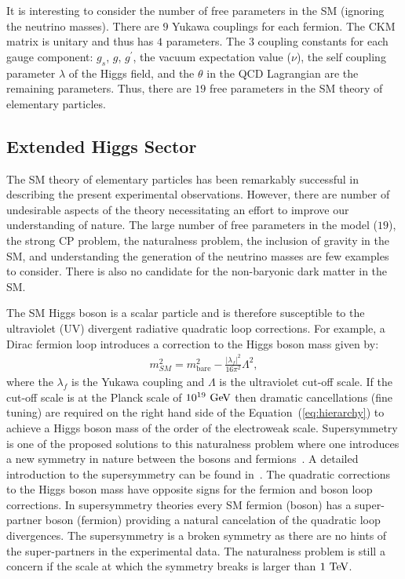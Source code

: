 It is interesting to consider the number of free parameters in the SM (ignoring the neutrino masses). There are $9$ Yukawa couplings for each fermion. The CKM matrix is unitary and thus has $4$ parameters. The $3$ coupling constants for each gauge component: $g_s$, $g$, $g^{'}$, the vacuum expectation value ($\nu$), the self coupling parameter $\lambda$ of the Higgs field, and the $\theta$ in the QCD Lagrangian are the remaining parameters. Thus, there are $19$ free parameters in the SM theory of elementary particles. 

\subsection{Extended Higgs Sector}

The SM theory of elementary particles has been remarkably successful in describing the present experimental observations. However, there are number of undesirable aspects of the theory necessitating an effort to improve our understanding of nature. The large number of free parameters in the model ($19$), the strong CP problem, the naturalness problem, the inclusion of gravity in the SM, and understanding the generation of the neutrino masses are few examples to consider. There is also no candidate for the non-baryonic dark matter in the SM. 

The SM Higgs boson is a scalar particle and is therefore susceptible to the ultraviolet (UV) divergent radiative quadratic loop corrections. For example, a Dirac fermion loop introduces a correction to the Higgs boson mass given by:
\begin{eqnarray} \label{eq:hierarchy}
m^{2}_{SM} = m^2_{\mathrm{bare}} - \frac{|\lambda_f|^2}{16\pi^2} \Lambda^2, 
\end{eqnarray}
where the $\lambda_f$ is the Yukawa coupling and $\Lambda$ is the ultraviolet cut-off scale. If the cut-off scale is at the Planck scale of $10^{19}~\mathrm{Ge\kern -0.1em V}$  then dramatic cancellations (fine tuning) are required on the right hand side of the Equation~(\ref{eq:hierarchy}) to achieve a Higgs boson mass of the order of the electroweak scale. Supersymmetry is one of the proposed solutions to this naturalness problem where one introduces a new symmetry in nature between the bosons and fermions~\cite{Golfand:1971iw,Wess:1974tw}. A detailed introduction to the supersymmetry can be found in~\cite{Martin:1997ns}. The quadratic corrections to the Higgs boson mass have opposite signs for the fermion and boson loop corrections. In supersymmetry theories every SM fermion (boson) has a super-partner boson (fermion) providing a natural cancelation of the quadratic loop divergences. The supersymmetry is a broken symmetry as there are no hints of the super-partners in the experimental data. The naturalness problem is still a concern if the scale at which the symmetry breaks is larger than $1~\mathrm{Te\kern -0.1em V}$.  

